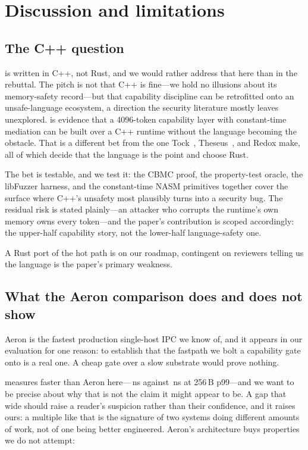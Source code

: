 \section{Discussion and limitations}
\label{sec:disc}

\subsection{The C++ question}
\label{sec:disc:cpp}

\sysname is written in C++, not Rust, and we would rather address
that here than in the rebuttal. The pitch is not that C++ is
fine---we hold no illusions about its memory-safety record---but that
capability discipline can be retrofitted onto an unsafe-language
ecosystem, a direction the security literature mostly leaves
unexplored. \sysname is evidence that a 4096-token capability layer
with constant-time mediation can be built over a C++ runtime without
the language becoming the obstacle. That is a different bet from the
one Tock~\cite{tock}, Theseus~\cite{theseus}, and Redox make, all of
which decide that the language is the point and choose Rust.

The bet is testable, and we test it: the CBMC proof, the
property-test oracle, the libFuzzer harness, and the constant-time
NASM primitives together cover the surface where C++'s unsafety most
plausibly turns into a security bug. The residual risk is stated
plainly---an attacker who corrupts the runtime's own memory owns
every token---and the paper's contribution is scoped accordingly: the
upper-half capability story, not the lower-half language-safety one.

A Rust port of the hot path is on our roadmap, contingent on
reviewers telling us the language is the paper's primary weakness.

\subsection{What the Aeron comparison does and does not show}
\label{sec:disc:aeron}

Aeron is the fastest production single-host IPC we know of, and it
appears in our evaluation for one reason: to establish that the
fastpath we bolt a capability gate onto is a real one. A cheap gate
over a slow substrate would prove nothing.

\sysname measures faster than Aeron here---\gatedAstraRTT\,ns against
\aeronRTT\,ns at 256\,B p99---and we want to be precise about why that
is not the claim it might appear to be. A gap that wide should raise a
reader's suspicion rather than their confidence, and it raises ours: a
multiple like that is the signature of two systems doing different
amounts of work, not of one being better engineered. Aeron's
architecture buys properties we do not attempt:

